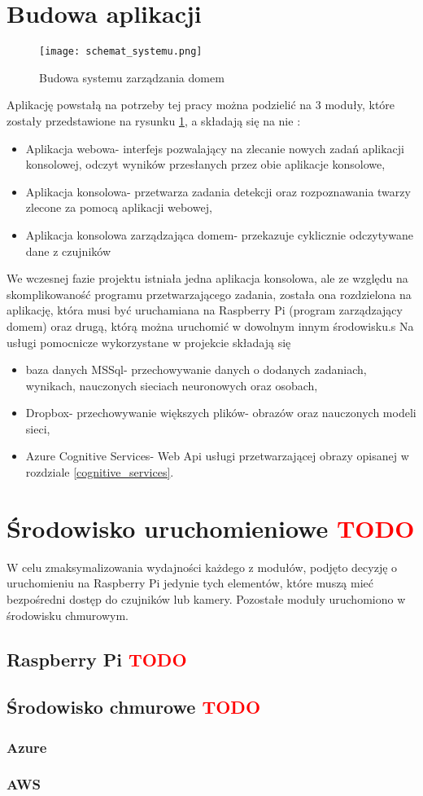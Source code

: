 \section{Budowa aplikacji}
\begin{figure}[H]
	\centering
	\texttt{[image: schemat\_systemu.png]}
	\caption{Budowa systemu zarządzania domem}
	\label{fig:schemat_systemu}
\end{figure}
Aplikację powstałą na potrzeby tej pracy można podzielić na 3 moduły, które zostały przedstawione na rysunku \ref{fig:schemat_systemu}, a składają się na nie :
\begin{itemize}
\item Aplikacja webowa- interfejs pozwalający na zlecanie nowych zadań aplikacji konsolowej, odczyt wyników przesłanych przez obie aplikacje konsolowe,
\item Aplikacja konsolowa- przetwarza zadania detekcji oraz rozpoznawania twarzy zlecone za pomocą aplikacji webowej,
\item Aplikacja konsolowa zarządzająca domem- przekazuje cyklicznie odczytywane dane z czujników %
\end{itemize}
We wczesnej fazie projektu istniała jedna aplikacja konsolowa, ale ze względu na skomplikowaność programu przetwarzającego zadania, została ona rozdzielona na aplikację, która musi być uruchamiana na Raspberry Pi (program zarządzający domem) oraz drugą, którą można uruchomić w dowolnym innym środowisku.s
Na usługi pomocnicze wykorzystane w projekcie składają się
\begin{itemize}
\item baza danych MSSql- przechowywanie danych o dodanych zadaniach, wynikach, nauczonych sieciach neuronowych oraz osobach,
\item Dropbox- przechowywanie większych plików- obrazów oraz nauczonych modeli sieci,
\item Azure Cognitive Services- Web Api usługi przetwarzającej obrazy opisanej w rozdziale \ref{cognitive_services}.
\end{itemize}

\section{Środowisko uruchomieniowe \textcolor{red}{TODO}}
W celu zmaksymalizowania wydajności każdego z modułów, podjęto decyzję o uruchomieniu na Raspberry Pi jedynie tych elementów, które muszą mieć bezpośredni dostęp do czujników lub kamery. Pozostałe moduły uruchomiono w środowisku chmurowym.
\subsection{Raspberry Pi \textcolor{red}{TODO}}


\subsection{Środowisko chmurowe \textcolor{red}{TODO}}
\subsubsection{Azure}
\subsubsection{AWS}